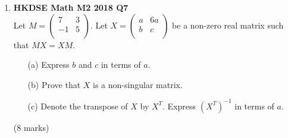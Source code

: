 \documentclass{report}
\begin{document}
\begin{enumerate}
\begin{enumerate}
		\item [(b)]Let $B = \begin{pmatrix}
			5 & 1\\
			-4 & 1\\
			\end{pmatrix}$. 
		\begin{enumerate}
			\item [(i)]Define $P = \begin{pmatrix}
			-1 & 0\\
			2 & -1\\
			\end{pmatrix}$. Evaluate $P^{-1}BP$.  
			\item [(ii)]Prove that $$B^n = 3^nI + 3^{n-1}n\begin{pmatrix}
			2&1\\-4&-2\\
			\end{pmatrix}$$ for any positive integer $n$.
			\item [(iii)]Does there exist a positive integer $m$ such that $|A^m - B^m| = 4m^2$ ? Explain your answer.
		\end{enumerate}
		(8 marks)
	\end{enumerate}	

	\item \textbf{HKDSE Math M2 2018 Q7}\\
	Let $M = 
		\begin{pmatrix}
		7 &3 \\
		-1&5\\
		\end{pmatrix}$. Let $X = 
		\begin{pmatrix}
		a &6a \\
		b&c\\
		\end{pmatrix}$ be a non-zero real matrix such that $MX = XM$. 
	\begin{enumerate}
		\item[(a)]Express $b$ and $c$ in  terms of $a$. 
		\item[(b)]Prove that $X$ is a non-singular matrix.
		\item[(c)]Denote the transpose of $X$ by $X^T$. Express $(X^T)^{-1}$ in terms of $a$.
	\end{enumerate}
	(8 marks)


\end{enumerate}
\end{document}
